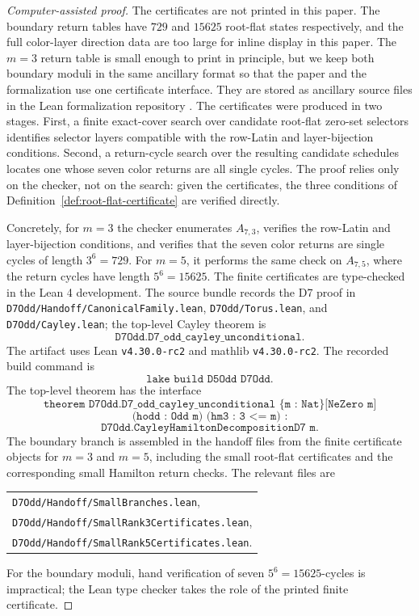 \documentclass[11pt]{article}
\theoremstyle{definition}
\begin{document}
\begin{proof}[Computer-assisted proof]
The certificates are not printed in this paper.  The boundary return tables have \(729\) and \(15625\) root-flat states respectively, and the full color-layer direction data are too large for inline display in this paper.  The \(m=3\) return table is small enough to print in principle, but we keep both boundary moduli in the same ancillary format so that the paper and the formalization use one certificate interface.  They are
stored as ancillary source files in the Lean formalization repository \cite{TorusProgram}.  The certificates were produced in two stages.  First, a finite exact-cover search over candidate root-flat zero-set selectors identifies selector layers compatible with the row-Latin and layer-bijection conditions.  Second, a return-cycle search over the resulting candidate schedules locates one whose seven color returns are all single cycles.  The proof relies only on the checker, not on the search: given the certificates, the three conditions of Definition~\ref{def:root-flat-certificate} are verified directly.

Concretely, for \(m=3\) the checker enumerates \(A_{7,3}\), verifies the row-Latin and layer-bijection
conditions, and verifies that the seven color returns are single cycles of length \(3^6=729\).  For
\(m=5\), it performs the same check on \(A_{7,5}\), where the return cycles have length
\(5^6=15625\).  The finite certificates are type-checked in the Lean 4 development.  The source bundle records the D7 proof in \texttt{D7Odd/Handoff/CanonicalFamily.lean}, \texttt{D7Odd/Torus.lean}, and \texttt{D7Odd/Cayley.lean}; the top-level Cayley theorem is
\[
\texttt{D7Odd.D7\_odd\_cayley\_unconditional}.
\]
The artifact uses Lean \texttt{v4.30.0-rc2} and mathlib \texttt{v4.30.0-rc2}.  The recorded build command is
\[
\texttt{lake build D5Odd D7Odd}.
\]
The top-level theorem has the interface
\[
\texttt{theorem D7Odd.D7\_odd\_cayley\_unconditional \{m : Nat\} [NeZero m]}
\]
\[
\texttt{(hodd : Odd m) (hm3 : 3 <= m) :}
\]
\[
\texttt{D7Odd.CayleyHamiltonDecompositionD7 m}.
\]
The boundary branch is assembled in the handoff files from the finite certificate objects for \(m=3\) and \(m=5\), including the small root-flat certificates and the corresponding small Hamilton return checks.  The relevant files are
\begin{center}
\begin{tabular}{l}
\texttt{D7Odd/Handoff/SmallBranches.lean},\\
\texttt{D7Odd/Handoff/SmallRank3Certificates.lean},\\
\texttt{D7Odd/Handoff/SmallRank5Certificates.lean}.
\end{tabular}
\end{center}
For the boundary moduli, hand verification of seven \(5^6=15625\)-cycles is impractical; the Lean type checker takes the role of the printed finite certificate.
\end{proof}
\end{document}
